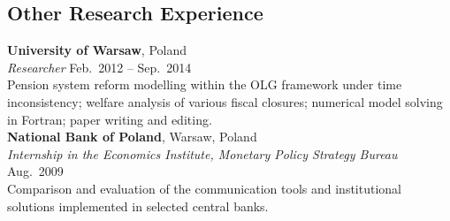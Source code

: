 \documentclass[margin,line]{resume}
\begin{document}
\begin{resume}
\section{\mysidestyle Other Research Experience}
\textbf{University of Warsaw}, Poland \vspace{0mm}\\
\textsl{Researcher} \hfill Feb.\ 2012 -- Sep.\ 2014\\
Pension system reform modelling within the OLG framework under time inconsistency; welfare analysis of various fiscal closures; numerical model solving in Fortran; paper writing and editing.\vspace{1.5mm} \\
\textbf{National Bank of Poland}, Warsaw, Poland \\
\textsl{Internship in the Economics Institute, Monetary Policy Strategy Bureau} \hfill Aug.\ 2009\\
Comparison and evaluation of the communication tools and institutional solutions implemented in selected central banks.  

\newpage	
\vspace{-5mm}


\end{resume}
\end{document}
